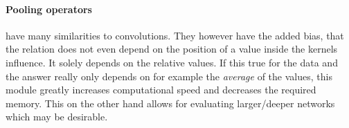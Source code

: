 \paragraph{Pooling operators} have many similarities to convolutions. They however have the added bias, that the relation does not even depend on the position of a value inside the kernels influence. 
It solely depends on the relative values. 
If this true for the data and the answer really only depends on for example the \emph{average} of the values, this module greatly increases computational speed and decreases the required memory.
This on the other hand allows for evaluating larger/deeper networks which may be desirable.